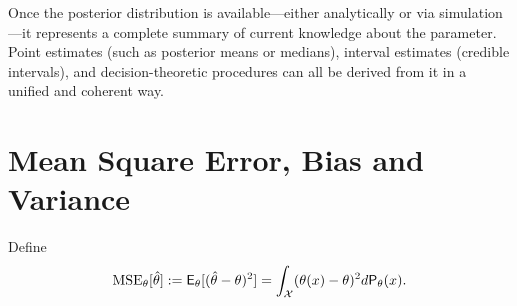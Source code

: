 \medskip
\noindent
Once the posterior distribution is available—either analytically or via simulation—it represents a complete summary of current knowledge about the parameter.
Point estimates (such as posterior means or medians), interval estimates (credible intervals), and decision-theoretic procedures can all be derived from it in a unified and coherent way.


\section{Mean Square Error, Bias and Variance}%
\label{sec:mse}
Define 
\[
    \text{MSE}_{\theta}[\hat{\theta}] :=
    \mathsf{E}_{\theta}[(\hat{\theta}-\theta)^2] = \int_{\mathcal{X}}^{} (\theta(x)-\theta)^2 d \mathsf{P}_{\theta}(x).
\]

